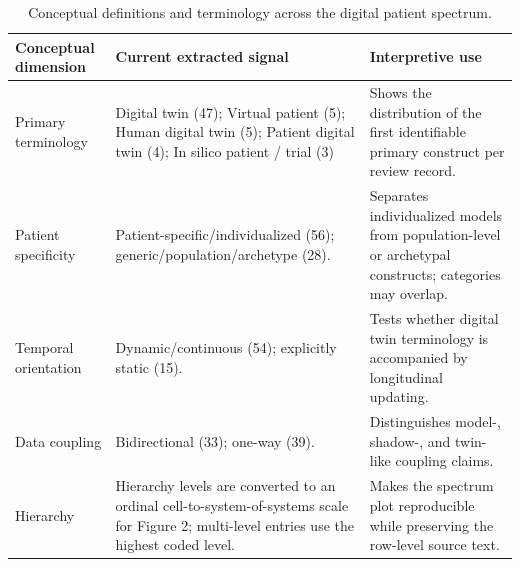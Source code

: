 \begin{table}[htbp]
\centering
\small
\caption{Conceptual definitions and terminology across the digital patient spectrum.}
\label{tab:concepts}
\begin{tabularx}{\textwidth}{@{}>{\raggedright\arraybackslash}p{}YY@{}}
\toprule
\textbf{Conceptual dimension} & \textbf{Current extracted signal} & \textbf{Interpretive use} \\
\midrule
Primary terminology & Digital twin (47); Virtual patient (5); Human digital twin (5); Patient digital twin (4); In silico patient / trial (3) & Shows the distribution of the first identifiable primary construct per review record. \\
Patient specificity & Patient-specific/individualized (56); generic/population/archetype (28). & Separates individualized models from population-level or archetypal constructs; categories may overlap. \\
Temporal orientation & Dynamic/continuous (54); explicitly static (15). & Tests whether digital twin terminology is accompanied by longitudinal updating. \\
Data coupling & Bidirectional (33); one-way (39). & Distinguishes model-, shadow-, and twin-like coupling claims. \\
Hierarchy & Hierarchy levels are converted to an ordinal cell-to-system-of-systems scale for Figure 2; multi-level entries use the highest coded level. & Makes the spectrum plot reproducible while preserving the row-level source text. \\
\bottomrule
\end{tabularx}
\end{table}
